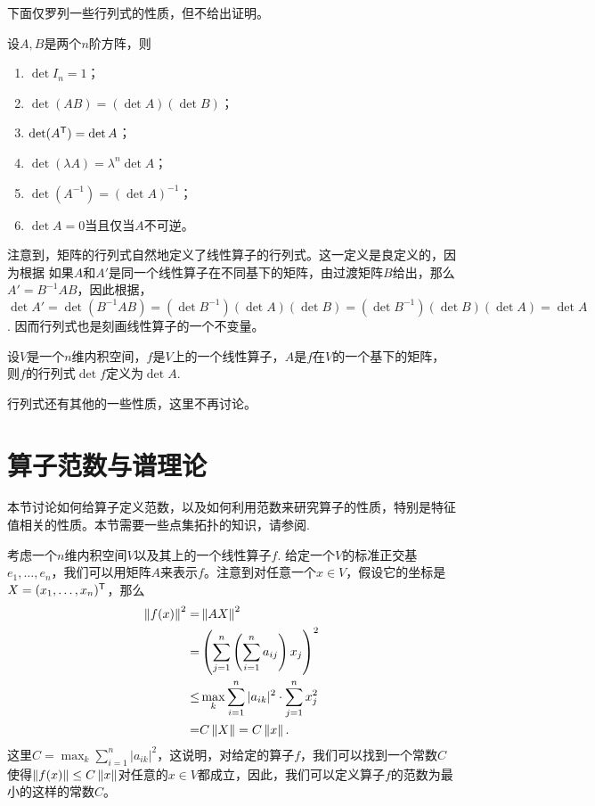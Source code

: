 下面仅罗列一些行列式的性质，但不给出证明。

\begin{proposition}\label{prop:determinant}
    设$A,B$是两个$n$阶方阵，则
    \begin{enumerate}
        \item $\det I_n=1$；
        \item $\det(AB)=(\det A)(\det B)$；
        \item $\det(A^{\mathsf{T}})=\det A$；
        \item $\det(\lambda A)=\lambda^n\det A$；
        \item $\det(A^{-1})=(\det A)^{-1}$；
        \item $\det A=0$当且仅当$A$不可逆。
    \end{enumerate}
\end{proposition}

注意到，矩阵的行列式自然地定义了线性算子的行列式。这一定义是良定义的，因为根据 如果$A$和$A'$是同一个线性算子在不同基下的矩阵，由过渡矩阵$B$给出，那么$A'=B^{-1}AB$，因此根据，$\det A'=\det(B^{-1}AB)=(\det B^{-1})(\det A)(\det B)=(\det B^{-1})(\det B)(\det A)=\det A$. 因而行列式也是刻画线性算子的一个不变量。

\begin{definition}[线性算子的行列式]
设$V$是一个$n$维内积空间，$f$是$V$上的一个线性算子，$A$是$f$在$V$的一个基下的矩阵，则$f$的行列式$\det f$定义为$\det A$.
\end{definition}

行列式还有其他的一些性质，这里不再讨论。

\section{算子范数与谱理论}

本节讨论如何给算子定义范数，以及如何利用范数来研究算子的性质，特别是特征值相关的性质。本节需要一些点集拓扑的知识，请参阅.

考虑一个$n$维内积空间$V$以及其上的一个线性算子$f$. 给定一个$V$的标准正交基$e_1,\dots,e_n$，我们可以用矩阵$A$来表示$f$。注意到对任意一个$x\in V$，假设它的坐标是$X=(x_1,\dots,x_n)^{\mathsf{T}}$，那么
\begin{align*}
    \left\|f(x)\right\|^2=&\left\|AX\right\|^2\\
    =&\left(\sum_{j=1}^n\left(\sum_{i=1}^na_{ij}\right)x_j\right)^2\\
    \leq &\max_{k}\sum_{i=1}^n|a_{ik}|^2\cdot\sum_{j=1}^n x_j^2\\
    =&C\left\|X\right\|=C\left\|x\right\|.
\end{align*}
这里$C=\max_{k}\sum_{i=1}^n|a_{ik}|^2$，这说明，对给定的算子$f$，我们可以找到一个常数$C$使得$\left\|f(x)\right\|\leq C\left\|x\right\|$对任意的$x\in V$都成立，因此，我们可以定义算子$f$的范数为最小的这样的常数$C$。

